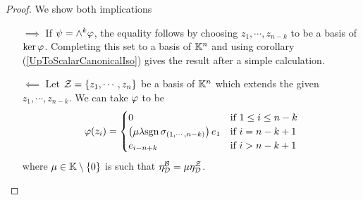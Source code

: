 \begin{proof}
We show both implications
\setlength{\leftmargini}{0cm}
\begin{itemize}
\item[$\boxed{\implies}$] If $\psi=\wedge^k\varphi$, the equality follows by choosing $z_1,\cdots, z_{n-k}$ to be a basis of $\ker\varphi$. Completing this set to a basis of $\mathbb{K}^n$ and using corollary (\ref{UpToScalarCanonicalIso}) gives the result after a simple calculation.
\item[$\boxed{\impliedby}$] Let $\mathcal{Z}=\left\{{z_1,\cdots, z_n}\right\}$ be a basis of $\mathbb{K}^n$ which extends the given $z_1,\cdots, z_{n-k}$. We can take $\varphi$ to be
\[\varphi(z_i)=\begin{cases}
0 & \text{if }1\leq i\leq n-k\\
\left({\mu\lambda\mathrm{sgn}\,\sigma_{(1,\cdots,n-k)}}\right) e_1 & \text{if }i=n-k+1\\
e_{i-n+k} & \text{if }i>n-k+1
\end{cases}\]
where $\mu\in\mathbb{K}\setminus\{0\}$ is such that $\eta^{\mathcal{B}}_{\mathcal{D}}=\mu \eta^{\mathcal{Z}}_{\mathcal{D}}$.
\end{itemize}
\setlength{\leftmargini}{0.5cm}

\end{proof}
